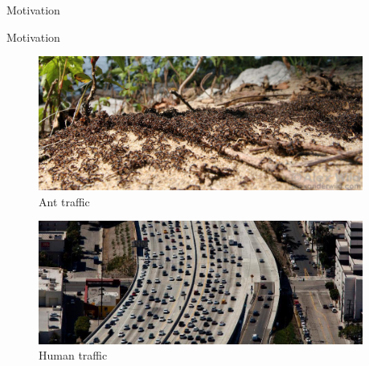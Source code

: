 \begin{subsection}{Motivation}
\begin{frame}{Motivation}

\vspace{1em}
\begin{figure}
\begin{columns}%
        \begin{column}{0.8\textwidth}%
            \includegraphics[width=\textwidth,right]{images/ant_battle1-XL_reduced}
        \end{column}%
        \begin{column}{0.2\textwidth}%
            \caption{Ant traffic \scriptsize{\cite{alexander_wild_ant_battle1-xl.jpg_????}}}
        \end{column}%
    \end{columns}
\end{figure}

\begin{figure}
\begin{columns}%
        \begin{column}{0.8\textwidth}%
            \includegraphics[width=\textwidth,right]{images/960x0_reduced}
        \end{column}%
        \begin{column}{0.2\textwidth}%
            \caption{Human traffic \scriptsize{\cite{patrick_t._fallon_960x0.jpg_2015}}}
        \end{column}%
    \end{columns}
\end{figure}

\end{frame}

\end{subsection}